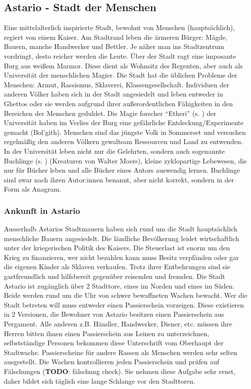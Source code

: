 \documentclass[11pt, twoside]{article}
\begin{document}
\subsection{Astario - Stadt der Menschen}
\label{sec:orgcf494fa}
Eine mittelalterlich inspirierte Stadt, bewohnt von Menschen (hauptsächlich), regiert von einem Kaiser. Am Stadtrand leben die ärmeren Bürger: Mägde, Bauern, manche Handwerker und Bettler. Je näher man ins Stadtzentrum vordringt, desto reicher werden die Leute. Über der Stadt ragt eine imposante Burg aus weißem Marmor. Diese dient als Wohnsitz des Regenten, aber auch als Universität der menschlichen Magier. Die Stadt hat die üblichen Probleme der Menschen: Armut, Rassismus, Sklaverei, Klassengesellschaft. Individuen der anderen Völker haben sich in der Stadt angesiedelt und leben entweder in Ghettos oder sie werden aufgrund ihrer außerordentlichen Fähigkeiten in den Bereichen der Menschen geduldet. Die Magie forscher ``Etheri'' (s. \pageref{etheri}) der Universität haben im Verlies der Burg eine gefährliche Entdeckung/Experimente gemacht (Bol'gith). Menschen sind das jüngste Volk in Sommerset und versuchen regelmäßig den anderen Völkern gewaltsam Ressourcen und Land zu entwenden.
In der Universität leben nicht nur die Gelehrten, sondern auch sogenannte Buchlinge (s. \pageref{buchling}) (Kreaturen von Walter Moers), kleine zyklopartige Lebewesen, die nur für Bücher leben und alle Bücher eines Autors auswendig lernen.
Buchlinge sind zwar nach ihren Autor:innen benannt, aber nicht korrekt, sondern in der Form als Anagram.
\subsubsection{Ankunft in Astario}
\label{sec:orgbf704e5}
Ausserhalb Astarios Stadtmauern haben sich rund um die Stadt hauptsächlich menschliche Bauern angesiedelt.
Die ländliche Bevölkerung leidet wirtschaftlich unter der kriegerischen Politik des Kaisers.
Die Steuerlast ist enorm um den Krieg zu finanzieren, wer nicht bezahlen kann muss Besitz verpfänden oder gar die eigenen Kinder als Sklaven verkaufen.
Trotz ihrer Entbehrungen sind sie gastfreundlich und hilfsbereit gegenüber reisenden und fremden.
Die Stadt Astario ist zugänglich über 2 Stadttore, eines im Norden und eines im Süden. Beide werden rund um die Uhr von schwer bewaffneten Wachen bewacht. Wer die Stadt betreten will muss entweder einen Passierschein vorzeigen. Diese existieren in 2 Versionen, die Bewohner von Astario besitzen einen Passierschein aus Pergament. Alle anderen z.B. Händler, Handwerker, Diener, etc. müssen ihre Herren bitten ihnen einen Passierschein aus Leinen zu unterzeichnen, selbstständige Personen bekommen diese Unterschrift vom Oberhaupt der Stadtwache. Passierscheine für andere Rassen als Menschen werden sehr selten ausgestellt.
Die Wachen kontrollieren jeden Passierschein und prüfen auf Fälschungen (\textbf{TODO}: fälschung check). Sie nehmen diese Aufgabe sehr ernst, daher bildet sich täglich eine lange Schlange vor den Stadttoren.
\end{document}
